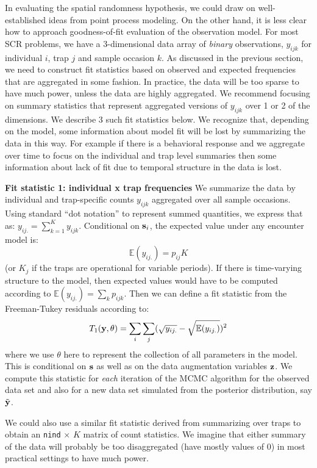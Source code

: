 {In evaluating the spatial randomness hypothesis, we could draw on
well-established ideas from point process modeling. On the other hand, 
it is less clear how to approach goodness-of-fit evaluation of the
observation model.  For most SCR problems, we have a 3-dimensional
data array of {\it binary} observations, $y_{ijk}$ for individual $i$,
trap $j$ and sample occasion $k$. As  discussed
in the previous section, we need to construct fit statistics based on
observed and expected frequencies that are aggregated in some fashion.
In practice, the data will be too sparse to have much power, unless
the 
data are highly aggregated. We recommend focusing on summary
statistics that represent aggregated versions of $y_{ijk}$ over 1 or 2
of the dimensions. We describe 3 such fit statistics below.  We
recognize that, depending on the model, some information about model
fit will be lost by summarizing the data in this way. For example if
there is a behavioral response and we aggregate over time to focus on
the individual and trap level summaries then some information about
lack of fit due to temporal structure in the data is lost.

{\bf Fit statistic 1: individual x trap frequencies} We summarize the
data by individual and trap-specific counts $y_{ijk}$
aggregated over
all sample occasions. Using standard ``dot notation'' to represent
summed quantities, we express that as:
$y_{ij.} = \sum_{k=1}^{K} y_{ijk}$.
 Conditional on ${\bf s}_{i}$, the expected value
under any encounter model is:
\[
 \mathbb{E}(y_{ij.}) = p_{ij} K
\]
(or $K_{j}$ if the traps are operational for variable periods). If
there is time-varying structure to the model, then expected values
would have to be computed according to $\mathbb{E}(y_{ij.}) = \sum_{k} p_{ijk}$.
Then we can define a fit statistic from the Freeman-Tukey residuals
according to:
\[
 T_{1}({\bf y}, \theta) = \sum_{i}\sum_{j} (\sqrt{ y_{ij.} } - \sqrt{ \mathbb{E}(y_{ij.}) })^2
\]
where we use $\theta$ here to represent the collection of all
parameters in the model.  This is conditional on ${\bf s}$ as well as
on the data augmentation variables ${\bf z}$. We compute this
statistic for {\it each} iteration of the MCMC algorithm for the
observed data set and also for a new data set simulated from the posterior
distribution, say $\tilde{\bf y}$.

We could also use a similar fit statistic derived from summarizing
over traps to obtain an \mbox{\tt nind} $\times$ $K$ matrix of count
statistics.  We imagine that either summary of the data will probably
be too disaggregated (have mostly values of 0) in most practical settings to have much power.


}
